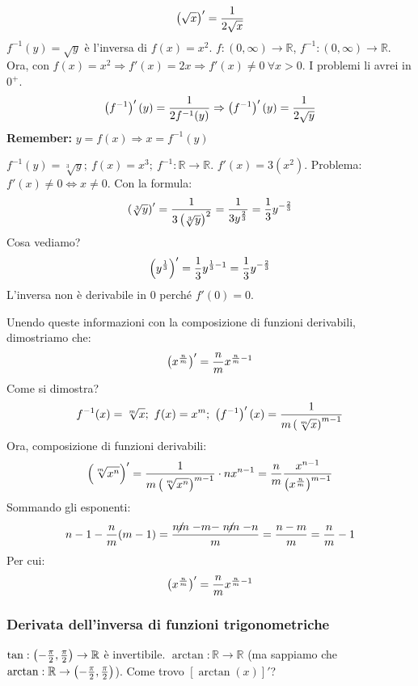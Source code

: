 \documentclass[12pt,a4paper]{article}
\begin{document}
$$\left( \sqrt{x} \right)' = { 1 \over 2\sqrt{x} }$$
$f^{-1}(y) = \sqrt{y}$ \`e l'inversa di $f(x)=x^2$. $f:(0,\infty)
\to \mathbb{R}$, $f^{-1}:(0,\infty) \to \mathbb{R}$. Ora, con
$f(x) = x^2 \Rightarrow f'(x) = 2x \Rightarrow f'(x) \neq 0
\ \forall x > 0$. I problemi li avrei in $0^+$.
$$ \left( f^{-1}\right)' (y) = {1 \over 2 f^{-1}(y) } \Rightarrow
 \left( f^{-1}\right)' (y) = {1 \over 2 \sqrt{y} }$$
\textbf{Remember:} $y = f(x) \Rightarrow x = f^{-1}(y)$

$f^{-1}(y) = \sqrt[3]{y} ; \ f(x) = x^3 ; \ f^{-1}: \mathbb{R} \to
\mathbb{R}$. $f'(x) = 3(x^2)$. Problema: $f'(x) \neq 0 \Leftrightarrow
x \neq 0$. Con la formula:
$$ \left( \sqrt[3]{y} \right)' = {1 \over 3 \left( \sqrt[3]{y} \right)^2 }
= {1 \over 3 y^{2 \over 3} } = {1 \over 3} y^{-{2 \over 3}} $$
Cosa vediamo?
$$ \left( y^{1 \over 3} \right)' = {1 \over 3} y^{{1 \over 3} -1} =
{1 \over 3} y^{-{2 \over 3}} $$
L'inversa non \`e derivabile in $0$ perch\'e $f'(0) = 0$.

Unendo queste informazioni con la composizione di funzioni derivabili,
dimostriamo che:
\begin{equation}
\left( x^{n \over m} \right)' = {n \over m} x^{{n \over m} -1} 
\end{equation}
Come si dimostra?
$$ f^{-1}(x) = \sqrt[m]{x} ; \ f(x) = x^m ; \ \left( f^{-1} \right)'(x) =
{1 \over m \left( \sqrt[m]{x} \right)^{m-1}} $$
Ora, composizione di funzioni derivabili:
$$ \left( \sqrt[m]{x^n} \right)' = {1 \over m \left( \sqrt[m]{x^n} 
\right)^{m-1}} \cdot n x^{n-1} = {n \over m} {x^{n-1} \over 
\left( x^{n \over m} \right)^{m-1}} $$
Sommando gli esponenti:
$$ n - 1 - {n \over m}(m - 1) = { \centernot{nm} - m - \centernot{nm} - n
 \over m} = {n - m \over m} = {n \over m} -1 $$
Per cui:
$$ \left( x^{n \over m} \right)' = {n \over m} x^{{n \over m} -1} $$

\subsubsection{Derivata dell'inversa di funzioni trigonometriche}
$\tan: \left( -{\pi \over 2} , {\pi \over 2} \right) \to \mathbb{R}$
\`e invertibile. $\arctan : \mathbb{R} \to \mathbb{R}$ (ma sappiamo
che $\arctan : \mathbb{R} \to \left( -{\pi \over 2} , {\pi \over 2} 
\right)$). Come trovo $\left[\arctan(x)\right]'$?
\end{document}

